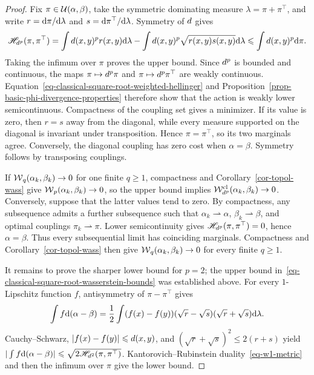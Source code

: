 \begin{proof}
	Fix $\pi\in\mathcal{U}(\alpha,\beta)$, take the symmetric dominating measure $\lambda=\pi+\pi^\top$, and write $r=\mathrm{d}\pi/\mathrm{d}\lambda$ and $s=\mathrm{d}\pi^\top/\mathrm{d}\lambda$. Symmetry of $d$ gives
	\[
		\mathscr H_{d^p}(\pi,\pi^\top)
		=
		\int d(x,y)^p r(x,y)\mathrm{d}\lambda
		-
		\int d(x,y)^p\sqrt{r(x,y)s(x,y)}\mathrm{d}\lambda
		\leqslant
		\int d(x,y)^p\mathrm{d}\pi.
	\]
	Taking the infimum over $\pi$ proves the upper bound. Since $d^p$ is bounded and continuous, the maps $\pi\mapsto d^p\pi$ and $\pi\mapsto d^p\pi^\top$ are weakly continuous. Equation~\eqref{eq-classical-square-root-weighted-hellinger} and Proposition~\ref{prop-basic-phi-divergence-properties} therefore show that the action is weakly lower semicontinuous. Compactness of the coupling set gives a minimizer. If its value is zero, then $r=s$ away from the diagonal, while every measure supported on the diagonal is invariant under transposition. Hence $\pi=\pi^\top$, so its two marginals agree. Conversely, the diagonal coupling has zero cost when $\alpha=\beta$. Symmetry follows by transposing couplings.

	If $\operatorname{\mathcal{W}}_q(\alpha_k,\beta_k)\to0$ for one finite $q\geq1$, compactness and Corollary~\ref{cor-topol-wass} give $\operatorname{\mathcal{W}}_p(\alpha_k,\beta_k)\to0$, so the upper bound implies $\mathcal W_{d^p}^{\mathrm{cl}}(\alpha_k,\beta_k)\to0$. Conversely, suppose that the latter values tend to zero. By compactness, any subsequence admits a further subsequence such that $\alpha_k\rightharpoonup\alpha$, $\beta_k\rightharpoonup\beta$, and optimal couplings $\pi_k\rightharpoonup\pi$. Lower semicontinuity gives $\mathscr H_{d^p}(\pi,\pi^\top)=0$, hence $\alpha=\beta$. Thus every subsequential limit has coinciding marginals. Compactness and Corollary~\ref{cor-topol-wass} then give $\operatorname{\mathcal{W}}_q(\alpha_k,\beta_k)\to0$ for every finite $q\geq1$.

	It remains to prove the sharper lower bound for $p=2$; the upper bound in~\eqref{eq-classical-square-root-wasserstein-bounds} was established above. For every $1$-Lipschitz function $f$, antisymmetry of $\pi-\pi^\top$ gives
	\[
		\int f\mathrm{d}(\alpha-\beta)
		=
		\frac12\int(f(x)-f(y))(\sqrt r-\sqrt s)(\sqrt r+\sqrt s)\mathrm{d}\lambda.
	\]
	Cauchy--Schwarz, $|f(x)-f(y)|\leqslant d(x,y)$, and $(\sqrt r+\sqrt s)^2\leq2(r+s)$ yield
	$|\int f\mathrm{d}(\alpha-\beta)|\leqslant\sqrt{2\mathscr H_{d^2}(\pi,\pi^\top)}$. Kantorovich--Rubinstein duality~\eqref{eq-w1-metric} and then the infimum over $\pi$ give the lower bound.
\end{proof}

